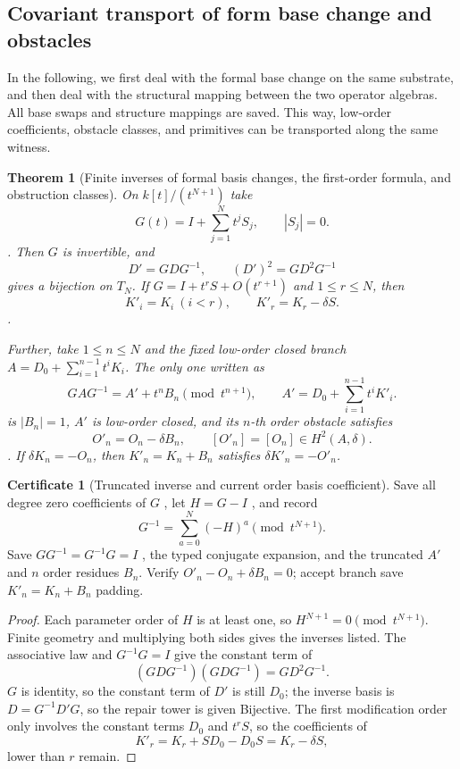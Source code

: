 \documentclass[12pt,a4paper,openany,notitlepage]{report}
\theoremstyle{plain}
\newtheorem{theorem}{Theorem}[chapter]
\theoremstyle{definition}
\newtheorem*{certificate}{Certificate}
\theoremstyle{remark}
\def\mathcal#1{#1}\def\mathsf#1{#1}\def\mathbb#1{#1}%
\begin{document}
\begin{CJK*}
\section { Covariant transport of form base change and obstacles }\label{exp:hom:obstruction-transport}


In the following, we first deal with the formal base change on the same substrate, and then deal with the structural mapping between the two operator algebras. All base swaps and structure mappings are saved. This way, low-order coefficients, obstacle classes, and primitives can be transported along the same witness.

\begin{theorem} [Finite inverses of formal basis changes, the first-order formula, and obstruction classes]
\label{exp:hom:formal-conjugation}
On $\mathbb k[t]/(t^{N+1})$ take
\[
 G(t)=I+\sum_{j=1}^{N}t^jS_j,\qquad |S_j|=0.
\].
Then $G$ is invertible, and
\[
 D'=GDG^{-1},\qquad (D')^2=GD^2G^{-1}
\]
gives a bijection on $\mathcal T_N$. If $G=I+t^rS+O(t^{r+1})$ and $1\le r\le N$, then
\[
 K'_i=K_i\ (i<r),\qquad K'_r=K_r-\delta S.
\].

Further, take $1\le n\le N$ and the fixed low-order closed branch $A=D_0+\sum_{i=1}^{n-1}t^iK_i$. The only one written as \[
 GAG^{-1}=A'+t^nB_n\pmod{t^{n+1}},
 \qquad
 A'=D_0+\sum_{i=1}^{n-1}t^iK'_i.
\] is $|B_n|=1$, $A'$ is low-order closed, and its $n$-th order obstacle satisfies \[
 O'_n=O_n-\delta B_n,\qquad [O'_n]=[O_n]\in H^2(\mathcal A,\delta).
\]. If $\delta K_n=-O_n$, then $K'_n=K_n+B_n$ satisfies $\delta K'_n=-O'_n$.\end{theorem}
\begin{certificate}
[Truncated inverse and current order basis coefficient]Save all degree zero coefficients of $G$ , let $H=G-I$ , and record \[
 G^{-1}=\sum_{a=0}^{N}(-H)^a\pmod{t^{N+1}}.
\] Save $GG^{-1}=G^{-1}G=I$ , the typed conjugate expansion, and the truncated $A'$ and $n$ order residues $B_n$. Verify $O'_n-O_n+\delta B_n=0$; accept branch save $K'_n=K_n+B_n$ padding.\end{certificate}
\begin{proof}
Each parameter order of $H$ is at least one, so $H^{N+1}=0\pmod{t^{N+1}}$. Finite geometry and multiplying both sides gives the inverses listed. The associative law and $G^{-1}G=I$ give the constant term of \[
 (GDG^{-1})(GDG^{-1})=GD^2G^{-1}.
\] $G$ is identity, so the constant term of $D'$ is still $D_0$; the inverse basis is $D=G^{-1}D'G$, so the repair tower is given Bijective. The first modification order only involves the constant terms $D_0$ and $t^rS$, so the coefficients of \[
 K'_r=K_r+SD_0-D_0S=K_r-\delta S,
\] lower than $r$ remain.


\end{proof}
\end{CJK*}
\end{document}
